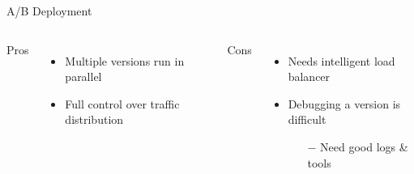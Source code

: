 \documentclass{slide}
\begin{document}
\begin{frame}{A/B Deployment}
    \vspace{1pt}
    \begin{columns}[t]
      \huge Pros
      {\LARGE
        \begin{itemize}
            \item { Multiple versions run in parallel\\}
            \vspace{1mm}
            \item { Full control over traffic distribution\\}
        \end{itemize}
      }
      \huge Cons
      {\LARGE
        \begin{itemize}
            \item { Needs intelligent load balancer\\}
            \vspace{1mm}
            \item { Debugging a version is difficult\\}
            \begin{itemize}
                \Large\item[$-$] Need good logs \& tools
            \end{itemize}
        \end{itemize}
      }
    \end{columns}
\end{frame}
\end{document}
